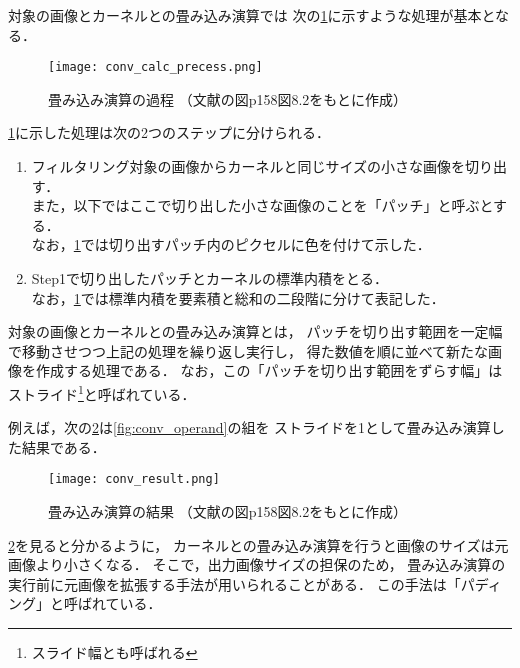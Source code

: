 \documentclass[\homedir/main.tex]{subfiles}
\begin{document}
\noindent
対象の画像とカーネルとの畳み込み演算では
次の\cref{fig:conv_calc_precess}に示すような処理が基本となる．

\begin{figure}[h]
    \centering
    \texttt{[image: conv\_calc\_precess.png]}
    \caption[畳み込み演算の過程]{
        畳み込み演算の過程 \linebreak
        （文献\cite{fujita2017}の図p158図8.2をもとに作成）
    }
    \label{fig:conv_calc_precess}
\end{figure}

\newpage \noindent
\cref{fig:conv_calc_precess}に示した処理は次の2つのステップに分けられる．
\begin{enumerate}[label=\textbf{Step\arabic*.}]
    \setlength{\leftskip}{0.5cm}
    \item フィルタリング対象の画像からカーネルと同じサイズの小さな画像を切り出す．\\
          また，以下ではここで切り出した小さな画像のことを「パッチ」と呼ぶとする．\\
          なお，\cref{fig:conv_calc_precess}では切り出すパッチ内のピクセルに色を付けて示した．
    \item Step1で切り出したパッチとカーネルの標準内積をとる．\\
          なお，\cref{fig:conv_calc_precess}では標準内積を要素積と総和の二段階に分けて表記した．
\end{enumerate}

対象の画像とカーネルとの畳み込み演算とは，
パッチを切り出す範囲を一定幅で移動させつつ上記の処理を繰り返し実行し，
得た数値を順に並べて新たな画像を作成する処理である．
なお，この「パッチを切り出す範囲をずらす幅」は
ストライド\footnote{スライド幅とも呼ばれる}と呼ばれている．

例えば，次の\cref{fig:conv_result}は\cref{fig:conv_operand}の組を
ストライドを1として畳み込み演算した結果である．

\begin{figure}[h]
    \centering
    \texttt{[image: conv\_result.png]}
    \caption[畳み込み演算の結果]{
        畳み込み演算の結果 \linebreak
        （文献\cite{fujita2017}の図p158図8.2をもとに作成）
    }
    \label{fig:conv_result}
\end{figure}

\cref{fig:conv_result}を見ると分かるように，
カーネルとの畳み込み演算を行うと画像のサイズは元画像より小さくなる．
そこで，出力画像サイズの担保のため，
畳み込み演算の実行前に元画像を拡張する手法が用いられることがある．
この手法は「パディング」と呼ばれている．
\end{document}

